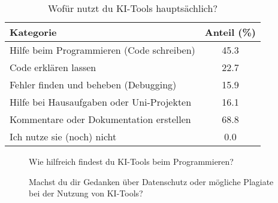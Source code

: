 \documentclass[paper=a4,fontsize=12pt,ngerman]{scrartcl}
\begin{document}
\begin{table}[h]
    \centering
    \caption{Wofür nutzt du KI-Tools hauptsächlich?}
    \begin{tabular}{l S[table-format=2.1]}
    \toprule
    \textbf{Kategorie} & \textbf{Anteil (\%)} \\
    \midrule
    Hilfe beim Programmieren (Code schreiben) & 45.3 \\
    Code erklären lassen & 22.7 \\
    Fehler finden und beheben (Debugging) & 15.9 \\
    Hilfe bei Hausaufgaben oder Uni-Projekten & 16.1 \\
    Kommentare oder Dokumentation erstellen & 68.8 \\
    Ich nutze sie (noch) nicht & 0.0 \\
    \bottomrule
    \end{tabular}
\end{table}

\begin{figure}[h]
    \centering
    \caption{Wie hilfreich findest du KI-Tools beim Programmieren?}
    \label{fig:pie-hilfreich}
\end{figure}


\begin{figure}[h]
    \centering
    \caption{Machst du dir Gedanken über Datenschutz oder mögliche Plagiate bei der Nutzung von KI-Tools?}
    \label{fig:pie-datenschutz}
\end{figure}
\end{document}
